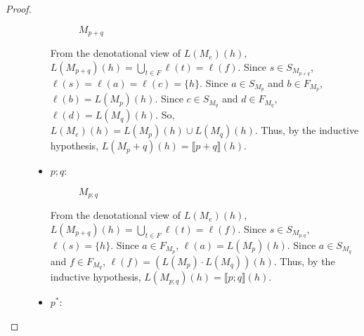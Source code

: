 \documentclass{article}
\newcommand\den[1]{\llbracket #1\rrbracket}
\renewcommand\star{^{\textstyle *}}
\begin{document}
\begin{proof}
\begin{description}
\begin{itemize}
\begin{figure}[H]
    \caption{$M_{p+q}$}
  \end{figure}
  
  From the denotational view of $L(M_e)(h)$,
  $L(M_{p+q})(h) = \bigcup_{t\in F}\ell(t) = \ell(f)$. Since 
  $s \in S_{M_{p+q}}$, $\ell(s) = \ell(a) = \ell(c) = \{h\}$. Since 
  $a \in S_{M_p}$ and $b \in F_{M_p}$, $\ell(b) = L(M_p)(h)$. Since 
  $c \in S_{M_q}$ and $d \in F_{M_q}$, $\ell(d) = L(M_q)(h)$. So, 
  $L(M_e)(h) = L(M_p)(h) \cup L(M_q)(h)$. Thus, by the inductive hypothesis,
  $L(M_p+q)(h) = \den{p+q}(h)$. 
  
  \item $p;q$:
  \begin{figure}[H]
    \centering
    \caption{$M_{p;q}$}
  \end{figure}
  
  From the denotational view of $L(M_e)(h)$,
  $L(M_{p+q})(h) = \bigcup_{t\in F}\ell(t) = \ell(f)$. Since 
  $s \in S_{M_{p;q}}$, $\ell(s) = \{h\}$. Since $a \in F_{M_p}$, 
  $\ell(a) = L(M_p)(h)$. Since $a \in S_{M_q}$ and $f \in F_{M_q}$,
  $\ell(f) = (L(M_p) \cdot L(M_q))(h)$. Thus, by the inductive hypothesis, 
  $L(M_{p;q})(h) = \den{p;q}(h)$.
  
  \item $p\star$:
  \begin{figure}[H]
    \centering
\end{figure}
\end{itemize}
\end{description}
\end{proof}
\end{document}
